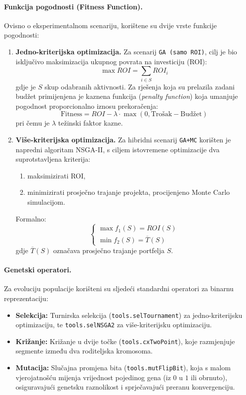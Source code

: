\paragraph{Funkcija pogodnosti (Fitness Function).}
Ovisno o eksperimentalnom scenariju, korištene su dvije vrste funkcije pogodnosti:

\begin{enumerate}
    \item \textbf{Jedno-kriterijska optimizacija.}  
    Za scenarij \texttt{GA (samo ROI)}, cilj je bio isključivo maksimizacija ukupnog povrata na investiciju (ROI):
    \[
    \max ROI = \sum_{i \in S} ROI_i
    \]
    gdje je $S$ skup odabranih aktivnosti.  
    Za rješenja koja su prelazila zadani budžet primijenjena je kaznena funkcija (\textit{penalty function}) koja umanjuje pogodnost proporcionalno iznosu prekoračenja:
    \[
    \text{Fitness} = ROI - \lambda \cdot \max(0, \text{Trošak} - \text{Budžet})
    \]
    pri čemu je $\lambda$ težinski faktor kazne.

    \item \textbf{Više-kriterijska optimizacija.}  
    Za hibridni scenarij \texttt{GA+MC} korišten je napredni algoritam NSGA-II, s ciljem istovremene optimizacije dva suprotstavljena kriterija:
    \begin{enumerate}
        \item maksimizirati ROI,
        \item minimizirati prosječno trajanje projekta, procijenjeno Monte Carlo simulacijom.
    \end{enumerate}
    Formalno:
    \[
    \begin{cases}
    \max f_1(S) = ROI(S) \\
    \min f_2(S) = \overline{T}(S)
    \end{cases}
    \]
    gdje $\overline{T}(S)$ označava prosječno trajanje portfelja $S$.
\end{enumerate}

\paragraph{Genetski operatori.}
Za evoluciju populacije korišteni su sljedeći standardni operatori za binarnu reprezentaciju:

\begin{itemize}
    \item \textbf{Selekcija:}  
    Turnirska selekcija (\texttt{tools.selTournament}) za jedno-kriterijsku optimizaciju,  
    te \texttt{tools.selNSGA2} za više-kriterijsku optimizaciju.
    
    \item \textbf{Križanje:}  
    Križanje u dvije točke (\texttt{tools.cxTwoPoint}), koje razmjenjuje segmente između dva roditeljska kromosoma.
    
    \item \textbf{Mutacija:}  
    Slučajna promjena bita (\texttt{tools.mutFlipBit}), koja s malom vjerojatnošću mijenja vrijednost pojedinog gena (iz $0$ u $1$ ili obrnuto), osiguravajući genetsku raznolikost i sprječavajući preranu konvergenciju.
\end{itemize}


